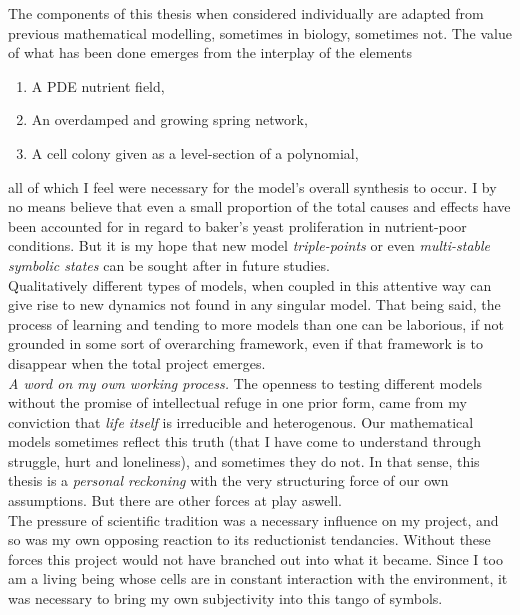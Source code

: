 \conclusions
The components of this thesis when considered individually
are adapted from previous mathematical 
modelling, sometimes in biology, sometimes not. The value of 
what has been done emerges from the interplay of the elements
\begin{enumerate}
    \item A PDE nutrient field,
    \item An overdamped and growing spring network,
    \item A cell colony given as a level-section of a polynomial,
\end{enumerate}
all of which I feel were necessary for the model's overall 
synthesis to occur. I by no means believe 
that even a small proportion of the total causes and effects
have been accounted for in regard to baker's yeast proliferation 
in nutrient-poor conditions. But it is my hope 
that new model \textit{triple-points} or even \textit{multi-stable symbolic states} 
can be sought after in future 
studies.
\\

Qualitatively different types of models, when coupled
in this attentive way can give rise to new dynamics not found in 
any singular model. That being said, 
the process of learning and tending to more models than one can be
laborious, if not grounded in some sort of overarching 
framework, even if that framework is to disappear 
when the total project emerges.
\\

\textit{A word on my own working process.}
The openness to testing different models without 
the promise of intellectual refuge in one prior form, came 
from my conviction that \textit{life itself} is irreducible
and heterogenous. Our mathematical models sometimes reflect 
this truth (that I have come to understand through struggle, 
hurt and loneliness), and sometimes 
they do not. In that sense, this thesis is a 
\textit{personal reckoning} with the very structuring 
force of our own assumptions. But there are other 
forces at play aswell.
\\

The pressure of scientific tradition was a necessary 
influence on my project, and so was 
my own opposing reaction to its reductionist tendancies.
Without these forces this project would not have 
branched out into what it became. Since 
I too am a living being whose cells 
are in constant interaction with the environment, 
it was necessary to bring my own subjectivity
into this tango of symbols.
\\

